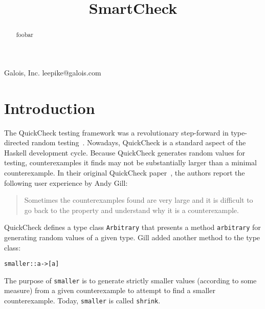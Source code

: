\documentclass[9pt]{sigplanconf}
\newenvironment{code}{\begin{alltt}\scriptsize}{\end{alltt}}
\newcommand{\ttp}[1]{\texttt{#1}}
\begin{document}


\title{SmartCheck}

           {Galois, Inc.}
           {leepike@galois.com}
\maketitle

\begin{abstract}
foobar
\end{abstract}





\section{Introduction}\label{sec:intro}

The QuickCheck testing framework was a revolutionary step-forward in
type-directed random testing~\cite{qc}.  Nowadays, QuickCheck is a standard
aspect of the Haskell development cycle.  Because QuickCheck generates random
values for testing, counterexamples it finds may not be substantially larger
than a minimal counterexample.  In their original QuickCheck paper~\cite{qc},
the authors report the following user experience by Andy Gill:
%
\begin{quote}
Sometimes the counterexamples found are very large and it is difficult to go
back to the property and understand why it is a counterexample.
\end{quote}
%
\noindent
QuickCheck defines a type class \ttp{Arbitrary} that presents a method
\ttp{arbitrary} for generating random values of a given type.  Gill added another
method to the type class:
%
\begin{code}
smaller :: a -> [a] 
\end{code}
%
\noindent
The purpose of \ttp{smaller} is to generate strictly smaller values (according to
some measure) from a given counterexample to attempt to find a smaller
counterexample.  Today, \ttp{smaller} is called \ttp{shrink}.
\end{document}
